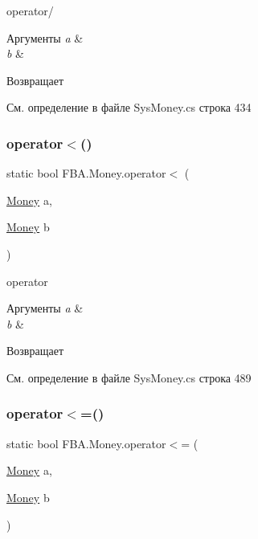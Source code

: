 operator/ 


\begin{DoxyParams}{Аргументы}
{\em a} & \\
\hline
{\em b} & \\
\hline
\end{DoxyParams}
\begin{DoxyReturn}{Возвращает}

\end{DoxyReturn}


См. определение в файле Sys\+Money.\+cs строка 434

\mbox{\label{struct_f_b_a_1_1_money_ab35ade105db479642dd38db28c2ddea3}} 
\subsubsection{\texorpdfstring{operator$<$()}{operator<()}}
{\footnotesize\ttfamily static bool F\+B\+A.\+Money.\+operator$<$ (\begin{DoxyParamCaption}\item[{\mbox{\hyperlink{struct_f_b_a_1_1_money}{Money}}}]{a,  }\item[{\mbox{\hyperlink{struct_f_b_a_1_1_money}{Money}}}]{b }\end{DoxyParamCaption})\hspace{0.3cm}{\ttfamily [static]}}



operator 


\begin{DoxyParams}{Аргументы}
{\em a} & \\
\hline
{\em b} & \\
\hline
\end{DoxyParams}
\begin{DoxyReturn}{Возвращает}

\end{DoxyReturn}


См. определение в файле Sys\+Money.\+cs строка 489

\mbox{\label{struct_f_b_a_1_1_money_a705bd91312107388336b6b1118b3f02f}} 
\subsubsection{\texorpdfstring{operator$<$=()}{operator<=()}}
{\footnotesize\ttfamily static bool F\+B\+A.\+Money.\+operator$<$= (\begin{DoxyParamCaption}\item[{\mbox{\hyperlink{struct_f_b_a_1_1_money}{Money}}}]{a,  }\item[{\mbox{\hyperlink{struct_f_b_a_1_1_money}{Money}}}]{b }\end{DoxyParamCaption})\hspace{0.3cm}{\ttfamily [static]}}



